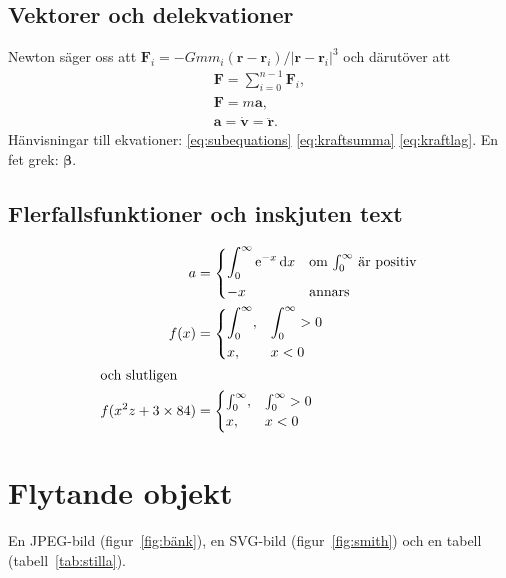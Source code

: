 \documentclass[a4paper, article, oneside, leqno]{memoir}
\begin{document}
\section{Vektorer och delekvationer}
Newton säger oss att \(\mathbf{F}_i = -Gmm_i(\mathbf{r}-\mathbf{r}_i)/|\mathbf{r}-\mathbf{r}_i|^3\) och därutöver att
\begin{subequations}
  \label{eq:subequations}
  \begin{gather}
    \mathbf{F} = \sum_{i=0}^{n-1} \mathbf{F}_i, \label{eq:kraftsumma} \\
    \mathbf{F} = m\mathbf{a} \label{eq:kraftlag}, \\
    \mathbf{a} = \dot{\mathbf{v}} = \ddot{\mathbf{r}}.
  \end{gather}
\end{subequations}
Hänvisningar till ekvationer: \ref{eq:subequations} \ref{eq:kraftsumma} \ref{eq:kraftlag}. En fet grek: \(\boldsymbol{\beta}\).

\section{Flerfallsfunktioner och inskjuten text}

\begin{align}
  a &=
  \begin{dcases*}
    \int_0^\infty \mathrm{e}^{-x}\,\mathrm{d}x & om \(\int_0^\infty\) är positiv\\
    -x & annars
  \end{dcases*} \\
  f(x) &=
  \begin{dcases}
    \int_0^\infty, & \int_0^\infty > 0 \\
    x, & x < 0
  \end{dcases} \\
  \shortintertext{och slutligen}
  f(x^2z+3\times 84) &=
  \begin{cases}
    \int_0^\infty, & \int_0^\infty > 0 \\
    x, & x < 0
  \end{cases}
\end{align}

\chapter{Flytande objekt}

En JPEG-bild (figur~\ref{fig:bänk}), en SVG-bild (figur~\ref{fig:smith}) och en tabell (tabell~\ref{tab:stilla}).
\end{document}
